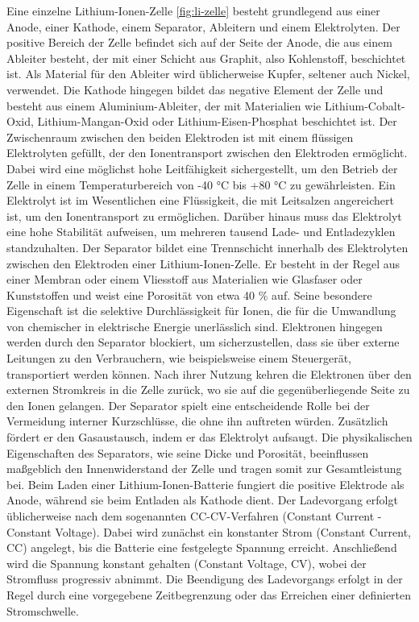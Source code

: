 Eine einzelne Lithium-Ionen-Zelle \ref{fig:li-zelle} besteht grundlegend aus einer Anode, einer Kathode, einem Separator, Ableitern und einem Elektrolyten. Der positive Bereich der Zelle befindet sich auf der Seite der Anode, die aus einem Ableiter besteht, der mit einer Schicht aus Graphit, also Kohlenstoff, beschichtet ist. Als Material für den Ableiter wird üblicherweise Kupfer, seltener auch Nickel, verwendet. Die Kathode hingegen bildet das negative Element der Zelle und besteht aus einem Aluminium-Ableiter, der mit Materialien wie Lithium-Cobalt-Oxid, Lithium-Mangan-Oxid oder Lithium-Eisen-Phosphat beschichtet ist. Der Zwischenraum zwischen den beiden Elektroden ist mit einem flüssigen Elektrolyten gefüllt, der den Ionentransport zwischen den Elektroden ermöglicht. Dabei wird eine möglichst hohe Leitfähigkeit sichergestellt, um den Betrieb der Zelle in einem Temperaturbereich von -40 °C bis +80 °C zu gewährleisten. \autocite{Lith-Akku}
Ein Elektrolyt ist im Wesentlichen eine Flüssigkeit, die mit Leitsalzen angereichert ist, um den Ionentransport zu ermöglichen. Darüber hinaus muss das Elektrolyt eine hohe Stabilität aufweisen, um mehreren tausend Lade- und Entladezyklen standzuhalten. \autocite[S.61f.]{Korthauer.2013}
Der Separator bildet eine Trennschicht innerhalb des Elektrolyten zwischen den Elektroden einer Lithium-Ionen-Zelle. Er besteht in der Regel aus einer Membran oder einem Vliesstoff aus Materialien wie Glasfaser oder Kunststoffen und weist eine Porosität von etwa 40 \% auf. Seine besondere Eigenschaft ist die selektive Durchlässigkeit für Ionen, die für die Umwandlung von chemischer in elektrische Energie unerlässlich sind. Elektronen hingegen werden durch den Separator blockiert, um sicherzustellen, dass sie über externe Leitungen zu den Verbrauchern, wie beispielsweise einem Steuergerät, transportiert werden können. Nach ihrer Nutzung kehren die Elektronen über den externen Stromkreis in die Zelle zurück, wo sie auf die gegenüberliegende Seite zu den Ionen gelangen. \newline \autocite[S. 80]{Korthauer.2013}
Der Separator spielt eine entscheidende Rolle bei der Vermeidung interner Kurzschlüsse, die ohne ihn auftreten würden. Zusätzlich fördert er den Gasaustausch, indem er das Elektrolyt aufsaugt. Die physikalischen Eigenschaften des Separators, wie seine Dicke und Porosität, beeinflussen maßgeblich den Innenwiderstand der Zelle und tragen somit zur Gesamtleistung bei. \autocite[S. 80]{Korthauer.2013}
Beim Laden einer Lithium-Ionen-Batterie fungiert die positive Elektrode als Anode, während sie beim Entladen als Kathode dient. Der Ladevorgang erfolgt üblicherweise nach dem sogenannten CC-CV-Verfahren (Constant Current - Constant Voltage). Dabei wird zunächst ein konstanter Strom (Constant Current, CC) angelegt, bis die Batterie eine festgelegte Spannung erreicht. Anschließend wird die Spannung konstant gehalten (Constant Voltage, CV), wobei der Stromfluss progressiv abnimmt. Die Beendigung des Ladevorgangs erfolgt in der Regel durch eine vorgegebene Zeitbegrenzung oder das Erreichen einer definierten Stromschwelle. \autocite[S. 15]{Korthauer.2013}

